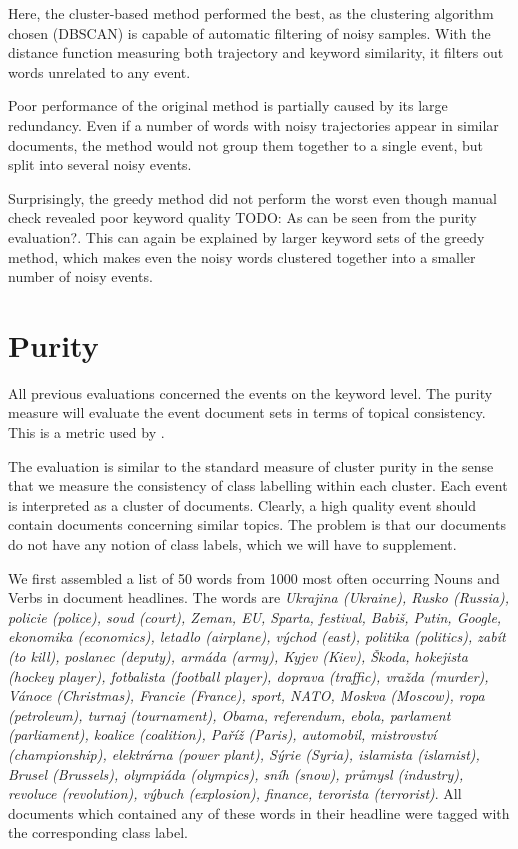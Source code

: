\hspace{\fill}

Here, the cluster-based method performed the best, as the clustering algorithm chosen (DBSCAN) is capable of automatic filtering of noisy samples. With the distance function measuring both trajectory and keyword similarity, it filters out words unrelated to any event.

Poor performance of the original method is partially caused by its large redundancy. Even if a number of words with noisy trajectories appear in similar documents, the method would not group them together to a single event, but split into several noisy events.

Surprisingly, the greedy method did not perform the worst even though manual check revealed poor keyword quality {\color{red} TODO: As can be seen from the purity evaluation?}. This can again be explained by larger keyword sets of the greedy method, which makes even the noisy words clustered together into a smaller number of noisy events.

\section{Purity}

All previous evaluations concerned the events on the keyword level. The purity measure will evaluate the event document sets in terms of topical consistency. This is a metric used by \cite{document-purity}.

The evaluation is similar to the standard measure of cluster purity in the sense that we measure the consistency of class labelling within each cluster. Each event is interpreted as a cluster of documents. Clearly, a high quality event should contain documents concerning similar topics. The problem is that our documents do not have any notion of class labels, which we will have to supplement.

We first assembled a list of 50 words from 1000 most often occurring Nouns and Verbs in document headlines. The words are \textit{Ukrajina (Ukraine), Rusko (Russia), policie (police), soud (court), Zeman, EU, Sparta, festival, Babiš, Putin, Google, ekonomika (economics), letadlo (airplane), východ (east), politika (politics), zabít (to kill), poslanec (deputy), armáda (army), Kyjev (Kiev), Škoda, hokejista (hockey player), fotbalista (football player), doprava (traffic), vražda (murder), Vánoce (Christmas), Francie (France), sport, NATO, Moskva (Moscow), ropa (petroleum), turnaj (tournament), Obama, referendum, ebola, parlament (parliament), koalice (coalition), Paříž (Paris), automobil, mistrovství (championship), elektrárna (power plant), Sýrie (Syria), islamista (islamist), Brusel (Brussels), olympiáda (olympics), sníh (snow), průmysl (industry), revoluce (revolution), výbuch (explosion), finance, terorista (terrorist)}. All documents which contained any of these words in their headline were tagged with the corresponding class label.

